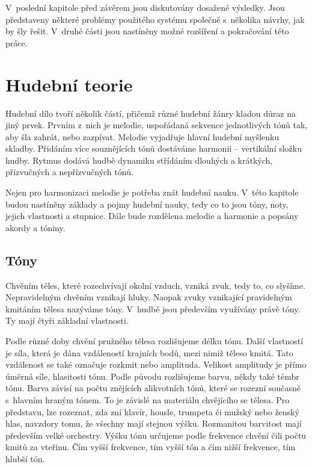 V~poslední kapitole před závěrem jsou diskutovány 
dosažené výsledky.
Jsou představeny některé problémy použitého systému společně s~několika návrhy,
jak by šly řešit.
V~druhé části jsou nastíněny možné rozšíření a pokračování této práce.

\chapter{Hudební teorie}
Hudební dílo tvoří několik částí, 
přičemž různé hudební žánry kladou důraz na jiný prvek.
Prvním z~nich je melodie, uspořádaná sekvence jednotlivých tónů tak,
aby šla zahrát, nebo zazpívat. 
Melodie vyjadřuje hlavní hudební myšlenku skladby. 
Přidáním více souznějících tónů dostáváme harmonii -- vertikální složku hudby.
Rytmus dodává hudbě dynamiku střídáním dlouhých a krátkých,
přízvučných a nepřízvučných tónů.
\par

Nejen pro harmonizaci melodie je potřeba znát hudební nauku. 
V~této kapitole budou nastíněny základy a pojmy hudební nauky, 
tedy co to jsou tóny, noty, jejich vlastnosti a stupnice. 
Dále bude rozdělena melodie a harmonie a popsány akordy a tóniny. 
\par 

\section{Tóny}
Chvěním těles, které rozechvívají okolní vzduch, vzniká zvuk, 
tedy to, co slyšíme. 
Nepravidelným chvěním vznikají hluky. 
Naopak zvuky vznikající pravidelným kmitáním tělesa nazýváme tóny. 
V~hudbě jsou především využívány právě tóny. 
Ty mají čtyři základní vlastnosti. 
\par

Podle různé doby chvění pružného tělesa rozlišujeme délku tónu. 
Další vlastností je síla, která je dána vzdáleností krajních bodů,
mezi nimiž těleso kmitá.
Tato vzdálenost se také označuje rozkmit nebo amplituda.
Velikost amplitudy je přímo úměrná síle, hlasitosti tónu.
Podle původu rozlišujeme barvu, někdy také témbr tónu.
Barva závisí na počtu znějících alikvotních tónů,
které se rozezní současně s~hlavním hraným tónem. 
To je závislé na materiálu chvějícího se tělesa.
Pro představu, lze rozeznat, zda zní klavír, housle, trumpeta či mužský nebo ženský hlas, 
navzdory tomu, že všechny mají stejnou výšku. 
Rozmanitou barvitost mají především velké orchestry.
Výšku tónu určujeme podle frekvence chvění čili počtu kmitů za vteřinu. 
Čím vyšší frekvence, tím vyšší tón a čím nižší frekvence, tím hlubší tón.
\cite{zenkl,cmiral} 
\par


